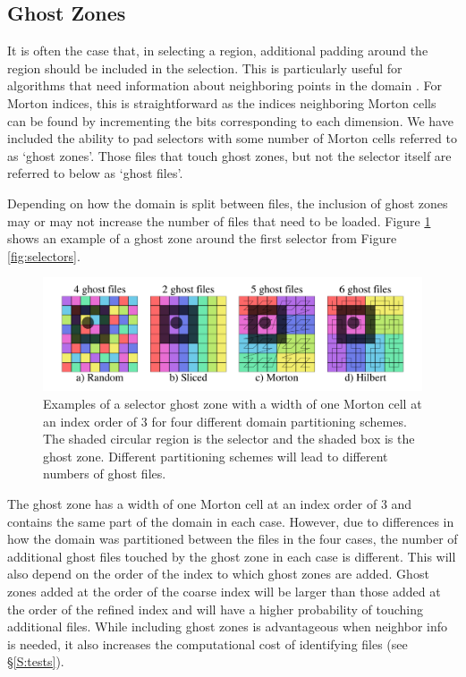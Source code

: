 \documentclass[apjl]{emulateapj}
\begin{document}
\subsection{Ghost Zones}
It is often the case that, in selecting a region, additional padding around the region should be included in the selection. This is particularly useful for algorithms that need information about neighboring points in the domain \citep[e.g. gas properties in simulations using Smoothed Particle Hydrodynamics; SPH;][]{Monaghan1992,Springel2001,Springel2005b}. For Morton indices, this is straightforward as the indices neighboring Morton cells can be found by incrementing the bits corresponding to each dimension. We have included the ability to pad selectors with some number of Morton cells referred to as `ghost zones'. Those files that touch ghost zones, but not the selector itself are referred to below as `ghost files'. 

Depending on how the domain is split between files, the inclusion of ghost zones may or may not increase the number of files that need to be loaded. Figure \ref{fig:ghosts} shows an example of a ghost zone around the first selector from Figure \ref{fig:selectors}. 
%
\begin{figure}[htbp]
\begin{center}
\includegraphics[width=\columnwidth,keepaspectratio]{../images/ghosts.png}
\caption{Examples of a selector ghost zone with a width of one Morton cell at an index order of 3 for  four different domain partitioning schemes. The shaded circular region is the selector and the shaded box is the ghost zone. Different partitioning schemes will lead to different numbers of ghost files.}
\label{fig:ghosts}
\end{center}
\end{figure}
%
The ghost zone has a width of one Morton cell at an index order of 3 and contains the same part of the domain in each case. However, due to differences in how the domain was partitioned between the files in the four cases, the number of additional ghost files touched by the ghost zone in each case is different. This will also depend on the order of the index to which ghost zones are added. Ghost zones added at the order of the coarse index will be larger than those added at the order of the refined index and will have a higher probability of touching additional files. While including ghost zones is advantageous when neighbor info is needed, it also increases the computational cost of identifying files (see \S\ref{S:tests}). 
\end{document}
